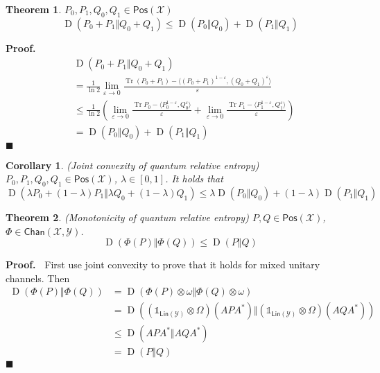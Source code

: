 \documentclass[aps,pra,onecolumn,notitlepage,superscriptaddress]{revtex4-1}
\newcommand{\spc}[1]{\mathcal{#1}}
\newcommand{\Lin}{\mathsf{Lin}}
\newcommand{\Pos}{\mathsf{Pos}}
\def\>{\rangle}
\def\<{\langle}
\newcommand{\Tr}{\operatorname{Tr}}
\newcommand{\op}[1]{\operatorname{#1}}
\newcommand{\Chan}{{\mathsf{Chan}}}
\newcommand\I{\mathds{1}}
\newtheorem{theo}{Theorem}
\newtheorem{cor}{Corollary}
\def\Proof{{\bf Proof.~}}
\def\qed{$\blacksquare$ \newline}
\begin{document}
    \begin{theo}
        $P_0, P_1, Q_0, Q_1 \in \Pos(\spc X)$
        \begin{equation}
            \op D(P_0 + P_1 \Vert Q_0 + Q_1) \leq \op D(P_0 \Vert Q_0) + \op D(P_1 \Vert Q_1)
        \end{equation}
    \end{theo}
    \Proof
    \begin{align*}
        &\op D(P_0+P_1 \Vert Q_0+Q_1) \\
        &= \frac{1}{\ln 2} \lim_{\varepsilon \to 0} \frac{\Tr(P_0+P_1) - \< (P_0+P_1)^{1-\varepsilon}, (Q_0+Q_1)^\varepsilon \>}{\varepsilon} \\
        &\leq \frac{1}{\ln 2} \left(
            \lim_{\varepsilon \to 0} \frac{\Tr P_0 - \< P_0^{1-\varepsilon}, Q_0^\varepsilon \>}{\varepsilon} + 
            \lim_{\varepsilon \to 0} \frac{\Tr P_1 - \< P_1^{1-\varepsilon}, Q_1^\varepsilon \>}{\varepsilon}
        \right) \\
        &= \op D(P_0 \Vert Q_0) + \op D(P_1 \Vert Q_1)
    \end{align*}
    \qed

    \begin{cor}
        (Joint convexity of quantum relative entropy) $P_0, P_1, Q_0, Q_1 \in \Pos(\spc X)$, $\lambda \in [0,1]$. It holds that 
        \begin{equation}
            \op D(\lambda P_0 + (1-\lambda) P_1 \Vert \lambda Q_0 + (1-\lambda) Q_1) \leq \lambda \op D(P_0 \Vert Q_0) + (1-\lambda) \op D(P_1 \Vert Q_1)
        \end{equation}
    \end{cor}

    \begin{theo}
        (Monotonicity of quantum relative entropy) $P,Q \in \Pos(\spc X)$, $\Phi \in \Chan(\spc X, \spc Y)$.
        \begin{equation}
            \op D(\Phi(P) \Vert \Phi(Q)) \leq \op D(P \Vert Q)
        \end{equation}
    \end{theo}
    \Proof
    First use joint convexity to prove that it holds for mixed unitary channels. Then
    \begin{align*}
        \op D(\Phi(P) \Vert \Phi(Q))
        &= \op D(\Phi(P) \otimes \omega \Vert \Phi(Q) \otimes \omega) \\
        &= \op D((\I_{\Lin(\spc Y)} \otimes \Omega)(APA^*) \Vert (\I_{\Lin(\spc Y)} \otimes \Omega)(AQA^*)) \\
        &\leq \op D(APA^* \Vert AQA^*) \\
        &= \op D(P \Vert Q)
    \end{align*}
    \qed
    
\end{document}
